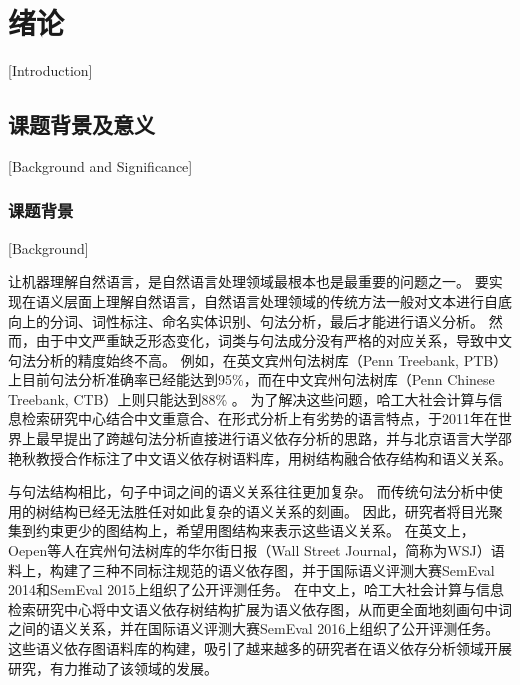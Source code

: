 
\chapter[绪论]{绪论}[Introduction]

\section{课题背景及意义}[Background and Significance]

\subsection{课题背景}[Background]




让机器理解自然语言，是自然语言处理领域最根本也是最重要的问题之一。
要实现在语义层面上理解自然语言，自然语言处理领域的传统方法一般对文本进行自底向上的分词、词性标注、命名实体识别、句法分析，最后才能进行语义分析。
然而，由于中文严重缺乏形态变化，词类与句法成分没有严格的对应关系，导致中文句法分析的精度始终不高。
例如，在英文宾州句法树库（Penn Treebank, PTB）\cite{marcus-etal-1993-building}上目前句法分析准确率已经能达到95\%，而在中文宾州句法树库（Penn Chinese Treebank, CTB）\cite{xue-etal-2005-penn}上则只能达到88\% \cite{dozat-etal-2017-deep}。
为了解决这些问题，哈工大社会计算与信息检索研究中心结合中文重意合、在形式分析上有劣势的语言特点，于2011年在世界上最早提出了跨越句法分析直接进行语义依存分析的思路，并与北京语言大学邵艳秋教授合作标注了中文语义依存树语料库，用树结构融合依存结构和语义关系。

与句法结构相比，句子中词之间的语义关系往往更加复杂。
而传统句法分析中使用的树结构已经无法胜任对如此复杂的语义关系的刻画。
因此，研究者将目光聚集到约束更少的图结构上，希望用图结构来表示这些语义关系。
在英文上，Oepen等人在宾州句法树库的华尔街日报（Wall Street Journal，简称为WSJ）语料上，构建了三种不同标注规范的语义依存图，并于国际语义评测大赛SemEval 2014\cite{oepen-etal-2014-semeval}和SemEval 2015\cite{oepen-etal-2015-semeval}上组织了公开评测任务。
在中文上，哈工大社会计算与信息检索研究中心将中文语义依存树结构扩展为语义依存图，从而更全面地刻画句中词之间的语义关系，并在国际语义评测大赛SemEval 2016\cite{che-etal-2016-semeval}上组织了公开评测任务。
这些语义依存图语料库的构建，吸引了越来越多的研究者在语义依存分析领域开展研究，有力推动了该领域的发展。


